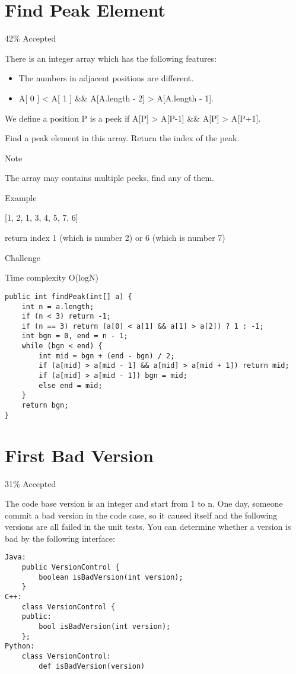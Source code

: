 \documentclass[9pt, b5paaper]{book}
\begin{document}
\section{Find Peak Element}
\label{sec-5-30}

42\% Accepted

There is an integer array which has the following features:

\begin{itemize}
\item The numbers in adjacent positions are different.

\item A[ 0 ] < A[ 1 ] \&\& A[A.length - 2] > A[A.length - 1].
\end{itemize}

We define a position P is a peek if A[P] > A[P-1] \&\& A[P] > A[P+1].

Find a peak element in this array. Return the index of the peak.

Note

The array may contains multiple peeks, find any of them.

Example

[1, 2, 1, 3, 4, 5, 7, 6]

return index 1 (which is number 2)  or 6 (which is number 7)

Challenge

Time complexity O(logN)
\begin{verbatim}
public int findPeak(int[] a) {
    int n = a.length;
    if (n < 3) return -1;
    if (n == 3) return (a[0] < a[1] && a[1] > a[2]) ? 1 : -1;
    int bgn = 0, end = n - 1;
    while (bgn < end) {
        int mid = bgn + (end - bgn) / 2;
        if (a[mid] > a[mid - 1] && a[mid] > a[mid + 1]) return mid;
        if (a[mid] > a[mid - 1]) bgn = mid;
        else end = mid;
    }
    return bgn;
}
\end{verbatim}
\section{First Bad Version}
\label{sec-5-31}

31\% Accepted

The code base version is an integer and start from 1 to n. One day, someone commit a bad version in the code case, so it caused itself and the following versions are all failed in the unit tests.
You can determine whether a version is bad by the following interface: 
\begin{verbatim}
Java:
    public VersionControl {
        boolean isBadVersion(int version);
    }
C++:
    class VersionControl {
    public:
        bool isBadVersion(int version);
    };
Python:
    class VersionControl:
        def isBadVersion(version)
\end{verbatim}
\end{document}
